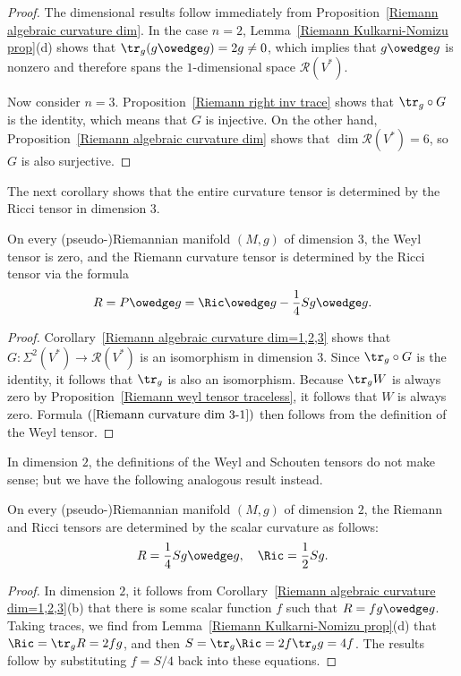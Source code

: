\begin{proof}
The dimensional results follow immediately from Proposition~\ref{Riemann algebraic curvature dim}. In the case $n=2$, Lemma~\ref{Riemann Kulkarni-Nomizu prop}(d) 
shows that $\tr_g(g\owedge g)=2g\neq 0$, which implies that $g\owedge g$ is nonzero and therefore spans the $1$-dimensional space $\mathcal{R}(V^*)$.\par
Now consider $n=3$. Proposition~\ref{Riemann right inv trace} shows that $\tr_g\circ G$ is the identity, which means that $G$ is injective. On the other hand, 
Proposition~\ref{Riemann algebraic curvature dim} shows that $\dim\mathcal{R}(V^*)=6$, so $G$ is also surjective.
\end{proof}
The next corollary shows that the entire curvature tensor is determined by the Ricci tensor in dimension $3$.
\begin{corollary}\label{Riemann curvature dim 3}
On every (pseudo-)Riemannian manifold $(M,g)$ of dimension $3$, the Weyl tensor is zero, and the Riemann curvature tensor is determined by the Ricci tensor 
via the formula
\begin{align}\label{Riemann curvature dim 3-1}
R=P\owedge g=\Ric\owedge g-\frac{1}{4}Sg\owedge g.
\end{align}
\end{corollary}
\begin{proof}
Corollary~\ref{Riemann algebraic curvature dim=1,2,3} shows that $G:\Sigma^2(V^*)\to\mathcal{R}(V^*)$ is an isomorphism in dimension $3$. Since $\tr_g\circ G$ is the 
identity, it follows that $\tr_g$ is also an isomorphism. Because $\tr_gW$ is always zero by Proposition~\ref{Riemann weyl tensor traceless}, it follows that $W$ is 
always zero. Formula $(\ref{Riemann curvature dim 3-1})$ then follows from the definition of the Weyl tensor.
\end{proof}
In dimension $2$, the definitions of the Weyl and Schouten tensors do not make sense; but we have the following analogous result instead.
\begin{corollary}\label{Riemann curvature dim 2}
On every (pseudo-)Riemannian manifold $(M,g)$ of dimension $2$, the Riemann and Ricci tensors are determined by the scalar curvature as follows:
\begin{align}\label{Riemann curvature dim 2-1}
R=\frac{1}{4}Sg\owedge g,\quad \Ric=\frac{1}{2}Sg.
\end{align}
\end{corollary}
\begin{proof}
In dimension $2$, it follows from Corollary~\ref{Riemann algebraic curvature dim=1,2,3}(b) that there is some scalar function $f$ such that $R=fg\owedge g$. Taking 
traces, we find from Lemma~\ref{Riemann Kulkarni-Nomizu prop}(d) that $\Ric=\tr_gR=2fg$, and then $S=\tr_g\Ric=2f\tr_gg=4f$. The results follow by substituting 
$f=S/4$ back into these equations.
\end{proof}

